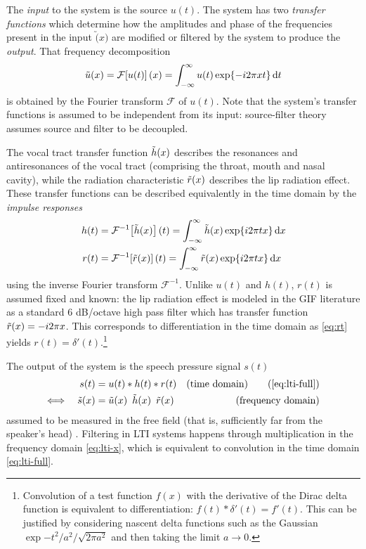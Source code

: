 \begin{chaptersections}
The \emph{input} to the system is the source $u(t)$.
The system has two \emph{transfer functions} which determine how the amplitudes and phase of the frequencies present in the input $\utilde(x)$ are modified or filtered by the system to produce the \emph{output}.
That frequency decomposition
\begin{equation}
    \tilde{u}(x) = \mathcal{F}\qty[u(t)](x) = \int_{-\infty}^\infty u(t) \exp{-i2\pi xt} \dd{t} \label{eq:ux}
\end{equation}
is obtained by the Fourier transform $\mathcal{F}$ of $u(t)$.
Note that the system's transfer functions is assumed to be independent from its input: source-filter theory assumes source and filter to be decoupled.

The vocal tract transfer function $\tilde{h}(x)$ describes the resonances and antiresonances of the vocal tract (comprising the throat, mouth and nasal cavity), while the radiation characteristic $\tilde{r}(x)$ describes the lip radiation effect.
These transfer functions can be described equivalently in the time domain by the \emph{impulse responses}
\begin{align}
    h(t) &= \mathcal{F}^{-1}\qty[\tilde{h}(x)](t) = \int_{-\infty}^\infty \tilde{h}(x) \exp{i2\pi tx} \dd{x} \label{eq:ht} \\
    r(t) &= \mathcal{F}^{-1}\qty[\tilde{r}(x)](t) = \int_{-\infty}^\infty \tilde{r}(x) \exp{i2\pi tx} \dd{x} \label{eq:rt}
\end{align}
using the inverse Fourier transform $\mathcal{F}^{-1}$.
Unlike $u(t)$ and $h(t)$, $r(t)$ is assumed fixed and known: the lip radiation effect is modeled in the GIF literature as a standard 6 dB/octave high pass filter \cite[][p.~128]{Stevens2000} which has transfer function $\tilde{r}(x) = -i2\pi x$.
This corresponds to differentiation in the time domain as \eqref{eq:rt} yields $r(t) = \delta'(t)$.\footnote{%
Convolution of a test function $f(x)$ with the derivative of the Dirac delta function is equivalent to differentiation: $f(t) * \delta'(t) = f'(t)$.
This can be justified by considering nascent delta functions such as the Gaussian $\exp{-t^2/a^2}/\sqrt{2 \pi a^2}$ and then taking the limit $a \rightarrow 0$.
}

The output of the system is the speech pressure signal $s(t)$
\begin{align}
    s(t) &= u(t) * h(t) * r(t) &\text{(time domain)} \tag{\ref{eq:lti-full}} \\
    \Longleftrightarrow \quad \stilde(x) &= \utilde(x) \phantom{*} \htilde(x) \phantom{*} \rtilde(x) &\text{(frequency domain)} \label{eq:lti-x}
\end{align}
assumed to be measured in the free field (that is, sufficiently far from the speaker's head) \citep{Stevens2000}.
Filtering in LTI systems happens through multiplication in the frequency domain \eqref{eq:lti-x}, which is equivalent to convolution in the time domain \eqref{eq:lti-full}.


\end{chaptersections}
